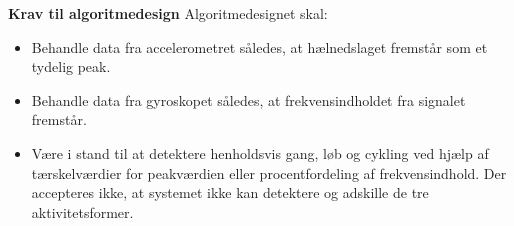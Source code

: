 \textbf{Krav til algoritmedesign} \newline 
Algoritmedesignet skal:
\begin{itemize}
	\item Behandle data fra accelerometret således, at hælnedslaget fremstår som et tydelig peak.
	\item Behandle data fra gyroskopet således, at frekvensindholdet fra signalet fremstår.
	\item Være i stand til at detektere henholdsvis gang, løb og cykling ved hjælp af tærskelværdier for peakværdien eller procentfordeling af frekvensindhold. Der accepteres ikke, at systemet ikke kan detektere og adskille de tre aktivitetsformer.
\end{itemize}

